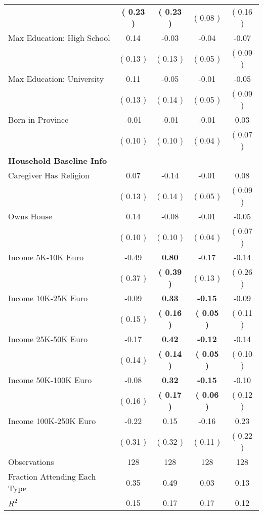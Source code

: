 \begin{table}[H]
{\begin{tabular}{lcccc}
\quad  & \textbf{(     0.23 )} & \textbf{(     0.23 )}  & (     0.08 )  & (     0.16 )  \\
\quad Max Education: High School &      0.14 &     -0.03 &     -0.04 &     -0.07 \\
\quad  & (     0.13 ) & (     0.13 )  & (     0.05 )  & (     0.09 )  \\
\quad Max Education: University &      0.11 &     -0.05 &     -0.01 &     -0.05 \\
\quad  & (     0.13 ) & (     0.14 )  & (     0.05 )  & (     0.09 )  \\
\quad Born in Province &     -0.01 &     -0.01 &     -0.01 &      0.03 \\
\quad  & (     0.10 ) & (     0.10 )  & (     0.04 )  & (     0.07 )  \\
\midrule
\textbf{Household Baseline Info} \\
\quad Caregiver Has Religion &      0.07 &     -0.14 &     -0.01 &      0.08 \\
\quad  & (     0.13 ) & (     0.14 )  & (     0.05 )  & (     0.09 )  \\
\quad Owns House &      0.14 &     -0.08 &     -0.01 &     -0.05 \\
\quad  & (     0.10 ) & (     0.10 )  & (     0.04 )  & (     0.07 )  \\
\quad Income 5K-10K Euro &     -0.49 & \textbf{     0.80} &     -0.17 &     -0.14 \\
\quad  & (     0.37 ) & \textbf{(     0.39 )}  & (     0.13 )  & (     0.26 )  \\
\quad Income 10K-25K Euro &     -0.09 & \textbf{     0.33} & \textbf{    -0.15} &     -0.09 \\
\quad  & (     0.15 ) & \textbf{(     0.16 )}  & \textbf{(     0.05 )}  & (     0.11 )  \\
\quad Income 25K-50K Euro &     -0.17 & \textbf{     0.42} & \textbf{    -0.12} &     -0.14 \\
\quad  & (     0.14 ) & \textbf{(     0.14 )}  & \textbf{(     0.05 )}  & (     0.10 )  \\
\quad Income 50K-100K Euro &     -0.08 & \textbf{     0.32} & \textbf{    -0.15} &     -0.10 \\
\quad  & (     0.16 ) & \textbf{(     0.17 )}  & \textbf{(     0.06 )}  & (     0.12 )  \\
\quad Income 100K-250K Euro &     -0.22 &      0.15 &     -0.16 &      0.23 \\
\quad  & (     0.31 ) & (     0.32 )  & (     0.11 )  & (     0.22 )  \\
\midrule
Observations & 128 & 128 & 128 & 128 \\
Fraction Attending Each Type &      0.35 &      0.49 &      0.03 &      0.13 \\
\midrule
$ R^2$ &      0.15 &      0.17 &      0.17 &      0.12 \\
\bottomrule
\end{tabular}}
\end{table}
